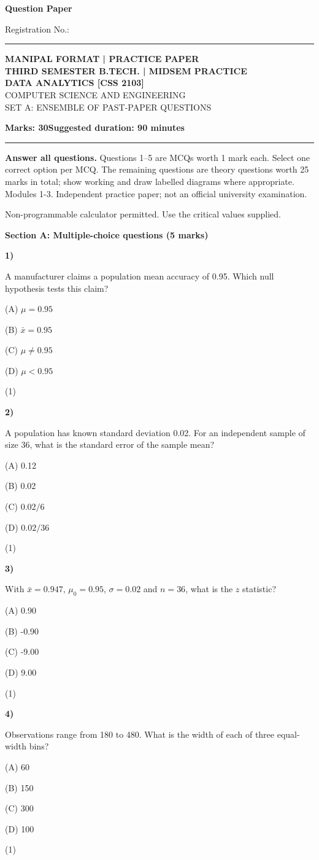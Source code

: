 \documentclass[11pt,a4paper]{article}
\newcommand{\question}[3]{\par\vspace{8pt}\noindent\begin{minipage}[t]{0.075\linewidth}\textbf{#1)}\end{minipage}\begin{minipage}[t]{0.855\linewidth}#3\end{minipage}\hfill\begin{minipage}[t]{0.055\linewidth}\raggedleft(#2)\end{minipage}\par}
\begin{document}
{\LARGE\bfseries Question Paper}\hfill {\small Registration No.: \rule{33mm}{0.3pt}}\par\vspace{8pt}
\begin{center}{\large\bfseries MANIPAL FORMAT | PRACTICE PAPER}\\[6pt]{\bfseries THIRD SEMESTER B.TECH. | MIDSEM PRACTICE}\\[4pt]{\bfseries DATA ANALYTICS [CSS 2103]}\\[4pt]{\small COMPUTER SCIENCE AND ENGINEERING}\\[3pt]{\small SET A: ENSEMBLE OF PAST-PAPER QUESTIONS}\end{center}
\textbf{Marks: 30}\hfill\textbf{Suggested duration: 90 minutes}\par\vspace{3pt}\hrule\vspace{5pt}
{\small\textbf{Answer all questions.} Questions 1--5 are MCQs worth 1 mark each. Select one correct option per MCQ. The remaining questions are theory questions worth 25 marks in total; show working and draw labelled diagrams where appropriate. Modules 1-3. Independent practice paper; not an official university examination.}\par
{\small Non-programmable calculator permitted. Use the critical values supplied.}\par
\medskip\textbf{Section A: Multiple-choice questions (5 marks)}\par
\question{1}{1}{A manufacturer claims a population mean accuracy of 0.95. Which null hypothesis tests this claim?\par (A) $\mu=0.95$\par (B) $\bar x=0.95$\par (C) $\mu\ne0.95$\par (D) $\mu<0.95$}
\question{2}{1}{A population has known standard deviation 0.02. For an independent sample of size 36, what is the standard error of the sample mean?\par (A) 0.12\par (B) 0.02\par (C) $0.02/6$\par (D) $0.02/36$}
\question{3}{1}{With $\bar x=0.947$, $\mu_0=0.95$, $\sigma=0.02$ and $n=36$, what is the $z$ statistic?\par (A) 0.90\par (B) -0.90\par (C) -9.00\par (D) 9.00}
\question{4}{1}{Observations range from 180 to 480. What is the width of each of three equal-width bins?\par (A) 60\par (B) 150\par (C) 300\par (D) 100}
\end{document}
